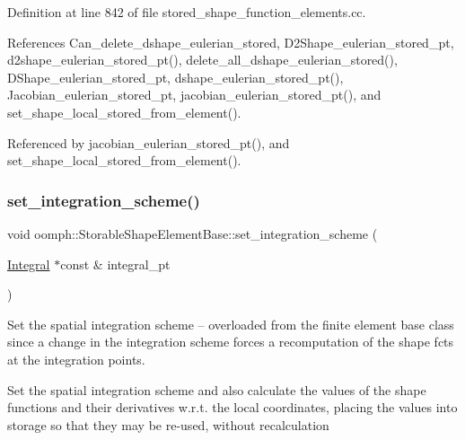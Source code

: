 Definition at line 842 of file stored\+\_\+shape\+\_\+function\+\_\+elements.\+cc.



References Can\+\_\+delete\+\_\+dshape\+\_\+eulerian\+\_\+stored, D2\+Shape\+\_\+eulerian\+\_\+stored\+\_\+pt, d2shape\+\_\+eulerian\+\_\+stored\+\_\+pt(), delete\+\_\+all\+\_\+dshape\+\_\+eulerian\+\_\+stored(), D\+Shape\+\_\+eulerian\+\_\+stored\+\_\+pt, dshape\+\_\+eulerian\+\_\+stored\+\_\+pt(), Jacobian\+\_\+eulerian\+\_\+stored\+\_\+pt, jacobian\+\_\+eulerian\+\_\+stored\+\_\+pt(), and set\+\_\+shape\+\_\+local\+\_\+stored\+\_\+from\+\_\+element().



Referenced by jacobian\+\_\+eulerian\+\_\+stored\+\_\+pt(), and set\+\_\+shape\+\_\+local\+\_\+stored\+\_\+from\+\_\+element().

\mbox{\label{classoomph_1_1StorableShapeElementBase_a1c20f4028654ec94f57037a3e3dc6582}} 
\subsubsection{\texorpdfstring{set\+\_\+integration\+\_\+scheme()}{set\_integration\_scheme()}}
{\footnotesize\ttfamily void oomph\+::\+Storable\+Shape\+Element\+Base\+::set\+\_\+integration\+\_\+scheme (\begin{DoxyParamCaption}\item[{\hyperlink{classoomph_1_1Integral}{Integral} $\ast$const \&}]{integral\+\_\+pt }\end{DoxyParamCaption})\hspace{0.3cm}{\ttfamily [virtual]}}



Set the spatial integration scheme -- overloaded from the finite element base class since a change in the integration scheme forces a recomputation of the shape fcts at the integration points. 

Set the spatial integration scheme and also calculate the values of the shape functions and their derivatives w.\+r.\+t. the local coordinates, placing the values into storage so that they may be re-\/used, without recalculation 

